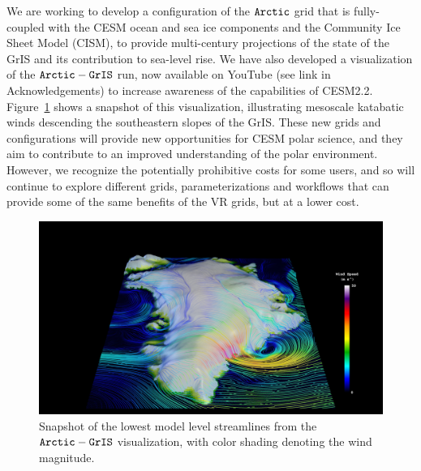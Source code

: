\documentclass[draft]{agujournal2019}
\begin{document}
We are  working to develop a configuration of the $\tt Arctic$ grid that is fully-coupled with the CESM ocean and sea ice components and the Community Ice Sheet Model (CISM), to provide multi-century projections of the state of the GrIS and its contribution to sea-level rise. We have also developed a visualization of the $\tt Arctic-GrIS$ run, now available on YouTube (see link in Acknowledgements) to increase awareness of the capabilities of CESM2.2. Figure~\ref{fig:viz} shows a snapshot of this visualization, illustrating mesoscale katabatic winds descending the southeastern slopes of the GrIS. These new grids and configurations will provide new opportunities for CESM polar science, and they aim to contribute to an improved understanding of the polar environment. However, we recognize the potentially prohibitive costs for some users, and so will continue to explore different grids, parameterizations and workflows that can provide some of the same benefits of the VR grids, but at a lower cost.

\begin{figure}[t]
\begin{center}
         \includegraphics[width=130mm]{Vis1472.jpg}
\end{center}
\caption{Snapshot of the lowest model level streamlines from the $\tt Arctic-GrIS$ visualization, with color shading denoting the wind magnitude.}
\label{fig:viz}
\end{figure}

%
%
%
%
\end{document}
